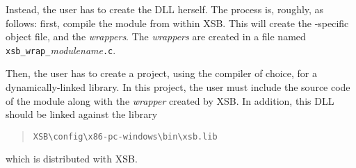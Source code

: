 Instead, the user has to create the DLL herself.  The process is, roughly,
as follows: first, compile the module from within XSB.
This will create the \ourprolog-specific object file, and the
\emph{wrappers}. The \emph{wrappers} are created in a file named
\texttt{xsb\_wrap\_}\emph{modulename}\texttt{.c}.

Then, the user has to create a project, using the compiler of choice, for a
dynamically-linked library. In this project, the user must include the
source code of the module along with the \emph{wrapper} created by XSB. In
addition, this DLL should be linked against the library
\begin{quote}
   \verb|XSB\config\x86-pc-windows\bin\xsb.lib|
\end{quote}
which is distributed with
XSB.



